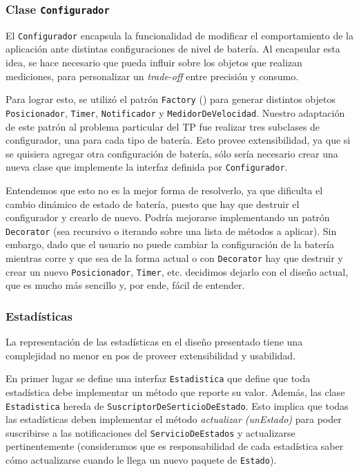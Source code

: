 \documentclass[10pt, a4paper,english,spanish]{article}
\renewcommand{\emph}[1]{\textit{#1}}
\begin{document}
\subsubsection{Clase \texttt{Configurador}}
El \texttt{Configurador} encapsula la funcionalidad de modificar el comportamiento de la aplicación ante distintas configuraciones de nivel de batería. Al encapsular esta idea, se hace necesario que pueda influir sobre los objetos que realizan mediciones, para personalizar un \emph{trade-off} entre precisión y consumo. 

Para lograr esto, se utilizó el patrón \texttt{Factory} (\cite{Gamma}) para generar distintos objetos \texttt{Posicionador}, \texttt{Timer}, \texttt{Notificador} y \texttt{MedidorDeVelocidad}. Nuestro adaptación de este patrón al problema particular del TP fue realizar tres subclases de configurador, una para cada tipo de batería. Esto provee extensibilidad, ya que si se quisiera agregar otra configuración de batería, sólo sería necesario crear una nueva clase que implemente la interfaz definida por \texttt{Configurador}. 

Entendemos que esto no es la mejor forma de resolverlo, ya que dificulta el cambio dinámico de estado de batería, puesto que hay que destruir el configurador y crearlo de nuevo. Podría mejorarse implementando un patrón \texttt{Decorator} (sea recursivo o iterando sobre una lista de métodos a aplicar). Sin embargo, dado que el usuario no puede cambiar la configuración de la batería mientras corre y que sea de la forma actual o con \texttt{Decorator} hay que destruir y crear un nuevo \texttt{Posicionador}, \texttt{Timer}, etc. decidimos dejarlo con el diseño actual, que es mucho más sencillo y, por ende, fácil de entender.

\subsubsection{Estadísticas}
La representación de las estadísticas en el diseño presentado tiene una complejidad no menor en pos de proveer extensibilidad y usabilidad. 

En primer lugar se define una interfaz \texttt{Estadistica} que define que toda estadística debe implementar un método que reporte su valor. Además, las clase \texttt{Estadistica} hereda de \texttt{SuscriptorDeSerticioDeEstado}. Esto implica que todas las estadísticas deben implementar el método \emph{actualizar (unEstado)} para poder suscribirse a las notificaciones del \texttt{ServicioDeEstados} y actualizarse pertinentemente (consideramos que es responsabilidad de cada estadística saber cómo actualizarse cuando le llega un nuevo paquete de \texttt{Estado}). 
\end{document}
